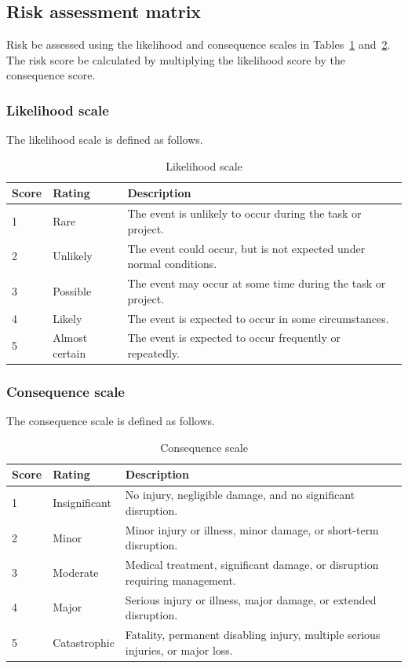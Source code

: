 \subsection{Risk assessment matrix}

Risk \must{} be assessed using the likelihood and consequence scales in Tables~\ref{tab:likelihood} and~\ref{tab:consequence}. The risk score \must{} be calculated by multiplying the likelihood score by the consequence score.

\subsubsection{Likelihood scale}

The likelihood scale is defined as follows.

\begin{table}[H]
\centering
\caption{Likelihood scale}
\label{tab:likelihood}
\begin{tabular}{p{} p{} p{}}
\hline
\textbf{Score} & \textbf{Rating} & \textbf{Description} \\
\hline
1 & Rare & The event is unlikely to occur during the task or project. \\
2 & Unlikely & The event could occur, but is not expected under normal conditions. \\
3 & Possible & The event may occur at some time during the task or project. \\
4 & Likely & The event is expected to occur in some circumstances. \\
5 & Almost certain & The event is expected to occur frequently or repeatedly. \\
\hline
\end{tabular}
\end{table}

\subsubsection{Consequence scale}

The consequence scale is defined as follows.

\begin{table}[H]
\centering
\caption{Consequence scale}
\label{tab:consequence}
\begin{tabular}{p{} p{} p{}}
\hline
\textbf{Score} & \textbf{Rating} & \textbf{Description} \\
\hline
1 & Insignificant & No injury, negligible damage, and no significant disruption. \\
2 & Minor & Minor injury or illness, minor damage, or short-term disruption. \\
3 & Moderate & Medical treatment, significant damage, or disruption requiring management. \\
4 & Major & Serious injury or illness, major damage, or extended disruption. \\
5 & Catastrophic & Fatality, permanent disabling injury, multiple serious injuries, or major loss. \\
\hline
\end{tabular}
\end{table}

